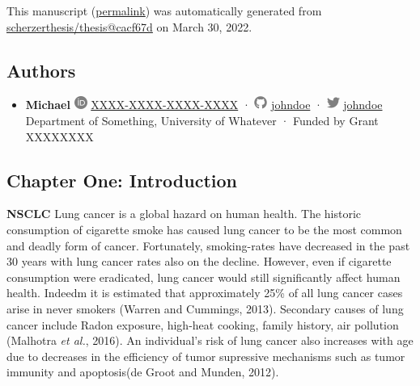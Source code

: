 This manuscript
(\href{https://scherzerthesis.github.io/thesis/v/cacf67ddbb3ecfa8a81d823abdfbeafd930f1848/}{permalink})
was automatically generated
from \href{https://github.com/scherzerthesis/thesis/tree/cacf67ddbb3ecfa8a81d823abdfbeafd930f1848}{scherzerthesis/thesis@cacf67d}
on March 30, 2022.

\hypertarget{authors}{%
\subsection{Authors}\label{authors}}

\begin{itemize}
\tightlist
\item
  \textbf{Michael}
  \includegraphics[width=0.16667in,height=0.16667in]{images/orcid.svg}
  \href{https://orcid.org/XXXX-XXXX-XXXX-XXXX}{XXXX-XXXX-XXXX-XXXX}
  · \includegraphics[width=0.16667in,height=0.16667in]{images/github.svg}
  \href{https://github.com/johndoe}{johndoe}
  · \includegraphics[width=0.16667in,height=0.16667in]{images/twitter.svg}
  \href{https://twitter.com/johndoe}{johndoe}
  Department of Something, University of Whatever
  · Funded by Grant XXXXXXXX
\end{itemize}

\hypertarget{chapter-one-introduction}{%
\subsection{Chapter One: Introduction}\label{chapter-one-introduction}}

\textbf{NSCLC} Lung cancer is a global hazard on human health. The historic consumption of cigarette smoke has caused lung cancer to be the most common and deadly form of cancer. Fortunately, smoking-rates have decreased in the past 30 years with lung cancer rates also on the decline. However, even if cigarette consumption were eradicated, lung cancer would still significantly affect human health. Indeedm it is estimated that approximately 25\% of all lung cancer cases arise in never smokers (Warren and Cummings, 2013). Secondary causes of lung cancer include Radon exposure, high-heat cooking, family history, air pollution (Malhotra \emph{et al.}, 2016). An individual's risk of lung cancer also increases with age due to decreases in the efficiency of tumor supressive mechanisms such as tumor immunity and apoptosis(de Groot and Munden, 2012).

